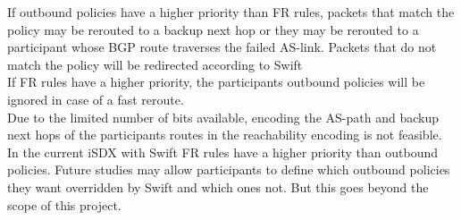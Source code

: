 If outbound policies have a higher priority than FR rules, packets that match the policy may be rerouted to a backup next hop or they may be rerouted to a participant whose BGP route traverses the failed AS-link. Packets that do not match the policy will be redirected according to Swift\\
If FR rules have a higher priority, the participants outbound policies will be ignored in case of a fast reroute. \\
Due to the limited number of bits available, encoding the AS-path and backup next hops of the participants routes in the reachability encoding is not feasible. In the current iSDX with Swift FR rules have a higher priority than outbound policies. Future studies may allow participants to define which outbound policies they want overridden by Swift and which ones not. But this goes beyond the scope of this project.

